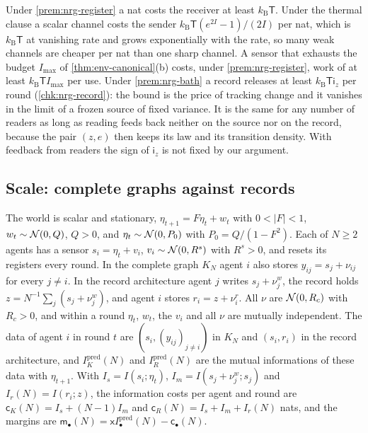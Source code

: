Under \cref{prem:nrg-register} a nat costs the receiver at least $k_{\mathrm B}\mathsf T$. Under the thermal clause a scalar channel costs the sender $k_{\mathrm B}\mathsf T(e^{2I}-1)/(2I)$ per nat, which is $k_{\mathrm B}\mathsf T$ at vanishing rate and grows exponentially with the rate, so many weak channels are cheaper per nat than one sharp channel. A sensor that exhausts the budget $I_{\max}$ of \cref{thm:env-canonical}(b) costs, under \cref{prem:nrg-register}, work of at least $k_{\mathrm B}\mathsf TI_{\max}$ per use. Under \cref{prem:nrg-bath} a record releases at least $k_{\mathrm B}\mathsf T\mathsf i_z$ per round (\cref{chk:nrg-record}): the bound is the price of tracking change and it vanishes in the limit of a frozen source of fixed variance. It is the same for any number of readers as long as reading feeds back neither on the source nor on the record, because the pair $(z,e)$ then keeps its law and its transition density. With feedback from readers the sign of $\mathsf i_z$ is not fixed by our argument.

\subsection{Scale: complete graphs against records}\label{sec:nrg-scale}

\begin{definition}\label{def:nrg-architectures}
The world is scalar and stationary, $\eta_{t+1}=F\eta_t+w_t$ with $0<\vert F\vert<1$, $w_t\sim\mathcal{N}(0,Q)$, $Q>0$, and $\eta_t\sim\mathcal{N}(0,P_0)$ with $P_0=Q/(1-F^2)$. Each of $N\ge2$ agents has a sensor $s_i=\eta_t+v_i$, $v_i\sim\mathcal{N}(0,R^s)$ with $R^s>0$, and resets its registers every round. In the complete graph $K_N$ agent $i$ also stores $y_{ij}=s_j+\nu_{ij}$ for every $j\ne i$. In the record architecture agent $j$ writes $s_j+\nu^w_j$, the record holds $z=N^{-1}\sum_j(s_j+\nu^w_j)$, and agent $i$ stores $r_i=z+\nu^r_i$. All $\nu$ are $\mathcal{N}(0,R_c)$ with $R_c>0$, and within a round $\eta_t$, $w_t$, the $v_i$ and all $\nu$ are mutually independent. The data of agent $i$ in round $t$ are $(s_i,(y_{ij})_{j\ne i})$ in $K_N$ and $(s_i,r_i)$ in the record architecture, and $I^{\mathrm{pred}}_K(N)$ and $I^{\mathrm{pred}}_R(N)$ are the mutual informations of these data with $\eta_{t+1}$. With $I_s=I(s_i;\eta_t)$, $I_m=I(s_j+\nu^w_j;s_j)$ and $I_r(N)=I(r_i;z)$, the information costs per agent and round are $\mathsf c_K(N)=I_s+(N-1)I_m$ and $\mathsf c_R(N)=I_s+I_m+I_r(N)$ nats, and the margins are $\mathsf m_\bullet(N)=\mathsf xI^{\mathrm{pred}}_\bullet(N)-\mathsf c_\bullet(N)$.
\end{definition}

